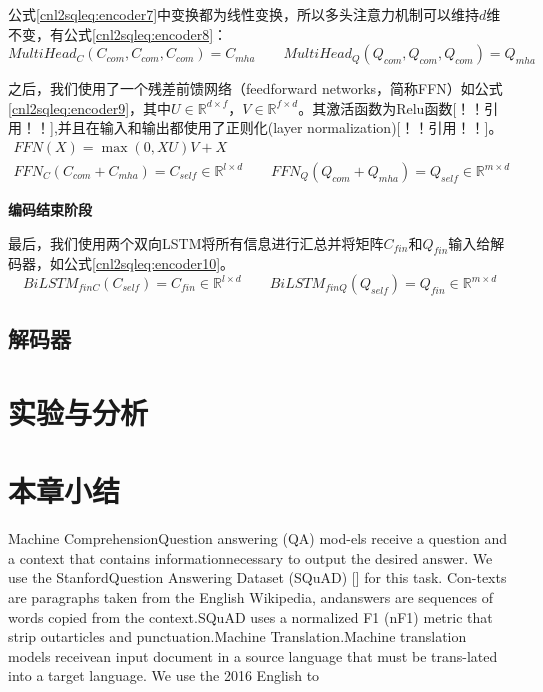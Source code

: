 公式\ref{cnl2sqleq:encoder7}中变换都为线性变换，所以多头注意力机制可以维持$d$维不变，有公式\ref{cnl2sqleq:encoder8}：
\begin{equation}
  \label{cnl2sqleq:encoder8}
  MultiHead_C(C_{com},C_{com},C_{com}) = C_{mha} \qquad MultiHead_Q(Q_{com},Q_{com},Q_{com}) = Q_{mha}
 \end{equation}

之后，我们使用了一个残差前馈网络（feedforward networks，简称FFN）如公式\ref{cnl2sqleq:encoder9}，其中$U \in \mathbb{R}^{d \times f}$，$V \in \mathbb{R}^{f \times d}$。其激活函数为Relu函数[！！引用！！],并且在输入和输出都使用了正则化(layer normalization)[！！引用！！]。
\begin{gather}
  \label{cnl2sqleq:encoder9}
  FFN(X) = \max(0,XU)V + X\\
  FFN_C(C_{com} + C_{mha}) = C_{self} \in \mathbb{R}^{l \times d} \qquad FFN_Q(Q_{com} + Q_{mha}) = Q_{self} \in \mathbb{R}^{m \times d}
\end{gather}

\textbf{编码结束阶段}

最后，我们使用两个双向LSTM将所有信息进行汇总并将矩阵$C_{fin}$和$Q_{fin}$输入给解码器，如公式\ref{cnl2sqleq:encoder10}。
\begin{equation}
  \label{cnl2sqleq:encoder10}
  BiLSTM_{finC}(C_{self}) = C_{fin} \in \mathbb{R}^{l \times d} \qquad BiLSTM_{finQ}(Q_{self}) = Q_{fin} \in \mathbb{R}^{m \times d} 
\end{equation}


\subsection{解码器}
\label{cnl2sql:decoder}

\section{实验与分析}
\label{cnl2sql:syyfx}
\section{本章小结}
Machine  ComprehensionQuestion answering (QA) mod-els receive a question and a context that contains informationnecessary  to  output  the  desired  answer.  We  use  the  StanfordQuestion  Answering  Dataset  (SQuAD)  []  for  this  task.  Con-texts  are  paragraphs  taken  from  the  English  Wikipedia,  andanswers  are  sequences  of  words  copied  from  the  context.SQuAD  uses  a  normalized  F1  (nF1)  metric  that  strip  outarticles and punctuation.Machine Translation.Machine translation models receivean  input  document  in  a  source  language  that  must  be  trans-lated  into  a  target  language.  We  use  the  2016  English  to

